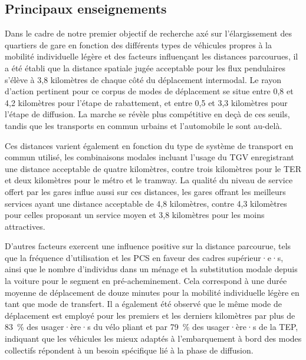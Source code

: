 \begin{refsegment}
\subsection*{Principaux enseignements
    \label{chap5:principaux-enseignements}
    }

Dans le cadre de notre premier objectif de recherche axé sur l'élargissement des quartiers de gare en fonction des différents types de véhicules propres à la mobilité individuelle légère et des facteurs influençant les distances parcourues, il a été établi que la distance spatiale jugée acceptable pour les flux pendulaires s'élève à 3,8 kilomètres de chaque côté du déplacement intermodal. Le rayon d'action pertinent pour ce corpus de modes de déplacement se situe entre 0,8 et 4,2 kilomètres pour l'étape de rabattement, et entre 0,5 et 3,3 kilomètres pour l'étape de diffusion. La marche se révèle plus compétitive en deçà de ces seuils, tandis que les transports en commun urbains et l'automobile le sont au-delà.%

Ces distances varient également en fonction du type de système de transport en commun utilisé, les combinaisons modales incluant l'usage du \acrshort{TGV} enregistrant une distance acceptable de quatre kilomètres, contre trois kilomètres pour le \acrshort{TER} et deux kilomètres pour le métro et le tramway. La qualité du niveau de service offert par les gares influe aussi sur ces distances, les gares offrant les meilleurs services ayant une distance acceptable de 4,8 kilomètres, contre 4,3 kilomètres pour celles proposant un service moyen et 3,8 kilomètres pour les moins attractives.%

D'autres facteurs exercent une influence positive sur la distance parcourue, tels que la fréquence d'utilisation et les \acrshort{PCS} en faveur des cadres supérieur·e·s, ainsi que le nombre d'individus dans un ménage et la substitution modale depuis la voiture pour le segment en pré-acheminement. Cela correspond à une durée moyenne de déplacement de douze minutes pour la mobilité individuelle légère en tant que mode de transfert. Il a également été observé que le même mode de déplacement est employé pour les premiers et les derniers kilomètres par plus de 83~\% des usager·ère·s du vélo pliant et par 79~\% des usager·ère·s de la \acrshort{TEP}, indiquant que les véhicules les mieux adaptés à l'embarquement à bord des modes collectifs répondent à un besoin spécifique lié à la phase de diffusion.%


\end{refsegment}

